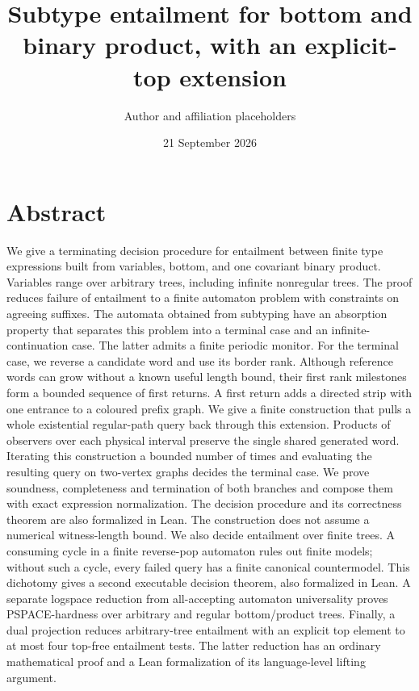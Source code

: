 \documentclass[
  11pt,
  a4paper,
]{article}
\title{Subtype entailment for bottom and binary product, with an
explicit-top extension}
\author{Author and affiliation placeholders}
\date{21 September 2026}
\begin{document}
\maketitle

\section{Abstract}\label{abstract}

We give a terminating decision procedure for entailment between finite
type expressions built from variables, bottom, and one covariant binary
product. Variables range over arbitrary trees, including infinite
nonregular trees. The proof reduces failure of entailment to a finite
automaton problem with constraints on agreeing suffixes. The automata
obtained from subtyping have an absorption property that separates this
problem into a terminal case and an infinite-continuation case. The
latter admits a finite periodic monitor. For the terminal case, we
reverse a candidate word and use its border rank. Although reference
words can grow without a known useful length bound, their first rank
milestones form a bounded sequence of first returns. A first return adds
a directed strip with one entrance to a coloured prefix graph. We give a
finite construction that pulls a whole existential regular-path query
back through this extension. Products of observers over each physical
interval preserve the single shared generated word. Iterating this
construction a bounded number of times and evaluating the resulting
query on two-vertex graphs decides the terminal case. We prove
soundness, completeness and termination of both branches and compose
them with exact expression normalization. The decision procedure and its
correctness theorem are also formalized in Lean. The construction does
not assume a numerical witness-length bound. We also decide entailment
over finite trees. A consuming cycle in a finite reverse-pop automaton
rules out finite models; without such a cycle, every failed query has a
finite canonical countermodel. This dichotomy gives a second executable
decision theorem, also formalized in Lean. A separate logspace reduction
from all-accepting automaton universality proves PSPACE-hardness over
arbitrary and regular bottom/product trees. Finally, a dual projection
reduces arbitrary-tree entailment with an explicit top element to at
most four top-free entailment tests. The latter reduction has an
ordinary mathematical proof and a Lean formalization of its
language-level lifting argument.
\end{document}
